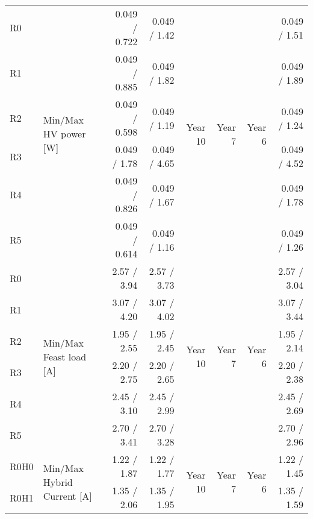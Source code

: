 \begin{table}[hb]
\begin{centering}
{\begin{tabular}{|l|l|r|r|r|r|r|r|}
R0                              & \multirow{6}{*}{Min/Max HV power [W]}        & 0.049 / 0.722 & 0.049 / 1.42 &\multirow{6}{*}{Year 10}&\multirow{6}{*}{Year  7}&\multirow{6}{*}{Year  6}&  0.049 / 1.51 \\ 
R1                              &                                              & 0.049 / 0.885 & 0.049 / 1.82 &  & &  &  0.049 / 1.89 \\ 
R2                              &                                              & 0.049 / 0.598 & 0.049 / 1.19 &  & &  &  0.049 / 1.24 \\ 
R3                              &                                              &  0.049 / 1.78 & 0.049 / 4.65 &  & &  &  0.049 / 4.52 \\ 
R4                              &                                              & 0.049 / 0.826 & 0.049 / 1.67 &  & &  &  0.049 / 1.78 \\ 
R5                              &                                              & 0.049 / 0.614 & 0.049 / 1.16 &  & &  &  0.049 / 1.26 \\ \hline
R0                              & \multirow{6}{*}{Min/Max Feast load [A]}      &   2.57 / 3.94 &  2.57 / 3.73 &\multirow{6}{*}{Year 10}&\multirow{6}{*}{Year  7}&\multirow{6}{*}{Year  6}&   2.57 / 3.04 \\ 
R1                              &                                              &   3.07 / 4.20 &  3.07 / 4.02 &  & &  &   3.07 / 3.44 \\ 
R2                              &                                              &   1.95 / 2.55 &  1.95 / 2.45 &  & &  &   1.95 / 2.14 \\ 
R3                              &                                              &   2.20 / 2.75 &  2.20 / 2.65 &  & &  &   2.20 / 2.38 \\ 
R4                              &                                              &   2.45 / 3.10 &  2.45 / 2.99 &  & &  &   2.45 / 2.69 \\ 
R5                              &                                              &   2.70 / 3.41 &  2.70 / 3.28 &  & &  &   2.70 / 2.96 \\ \hline
R0H0                            & \multirow{13}{*}{Min/Max Hybrid Current [A]} &   1.22 / 1.87 &  1.22 / 1.77 &\multirow{13}{*}{Year 10}&\multirow{13}{*}{Year  7}&\multirow{13}{*}{Year  6}&   1.22 / 1.45 \\ 
R0H1                            &                                              &   1.35 / 2.06 &  1.35 / 1.95 &  & &  &   1.35 / 1.59 \\ 

\end{tabular}}
\end{centering}
\end{table}
